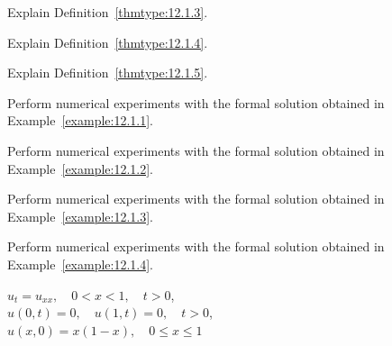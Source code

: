 \exercises
\begin{exerciselist}
  \item\label{exer:12.1.1} Explain Definition~\ref{thmtype:12.1.3}.

  \item\label{exer:12.1.2} Explain Definition~\ref{thmtype:12.1.4}.

  \item\label{exer:12.1.3} Explain Definition~\ref{thmtype:12.1.5}.

  \item\label{exer:12.1.4} \Cex Perform numerical experiments with the formal solution obtained in
        Example~\ref{example:12.1.1}.

  \item\label{exer:12.1.5} \Cex Perform numerical experiments with the formal solution obtained in
        Example~\ref{example:12.1.2}.

  \item\label{exer:12.1.6} \Cex Perform numerical experiments with the formal solution obtained in
        Example~\ref{example:12.1.3}.

  \item\label{exer:12.1.7} \Cex Perform numerical experiments with the formal solution obtained in
        Example~\ref{example:12.1.4}.


  \item\label{exer:12.1.8} $u_{t}=u_{xx},\quad0<x<1,\quad t>0$,\\ $u(0,t)=0,\quad u(1,t)=0,\quad t>0$,\\ $u(x,0)=x(1-x),\quad0\le x\le1$


\end{exerciselist}
